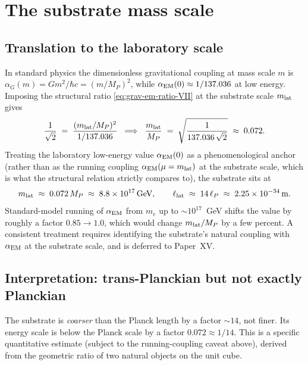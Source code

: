 \documentclass[11pt,a4paper]{article}
\begin{document}
\section{The substrate mass scale}
\label{sec:m-lat}

\subsection{Translation to the laboratory scale}

In standard physics the dimensionless gravitational coupling at
mass scale $m$ is $\alpha_G(m) = G m^2/\hbar c = (m/M_P)^2$,
while $\alpha_{\rm EM}(0) \approx 1/137.036$ at low energy.
Imposing the structural ratio \eqref{eq:grav-em-ratio-VII} at
the substrate scale $m_{\rm lat}$ gives
\begin{equation}
\frac{1}{\sqrt{2}} \;=\; \frac{(m_{\rm lat}/M_P)^2}{1/137.036}
\;\;\Longrightarrow\;\;
\frac{m_{\rm lat}}{M_P} \;=\; \sqrt{\frac{1}{137.036\,\sqrt{2}}}
\;\approx\; 0.072.
\label{eq:m-lat}
\end{equation}
Treating the laboratory low-energy value $\alpha_{\rm EM}(0)$ as
a phenomenological anchor (rather than as the running coupling
$\alpha_{\rm EM}(\mu = m_{\rm lat})$ at the substrate scale, which
is what the structural relation strictly compares to), the
substrate sits at
\begin{equation}
m_{\rm lat} \;\approx\; 0.072\,M_P \;\approx\;
8.8 \times 10^{17}\,\text{GeV},
\qquad
\ell_{\rm lat} \;\approx\; 14\,\ell_P
\;\approx\; 2.25 \times 10^{-34}\,\text{m}.
\end{equation}
Standard-model running of $\alpha_{\rm EM}$ from $m_e$ up to
$\sim 10^{17}$~GeV shifts the value by roughly a factor $0.85
\to 1.0$, which would change $m_{\rm lat}/M_P$ by a few
percent. A consistent treatment requires identifying the
substrate's natural coupling with $\alpha_{\rm EM}$ at the
substrate scale, and is deferred to Paper~XV.

\subsection{Interpretation: trans-Planckian but not exactly Planckian}

The substrate is \emph{coarser} than the Planck length by a
factor $\sim 14$, not finer. Its energy scale is below the
Planck scale by a factor $0.072 \approx 1/14$. This is a
specific quantitative estimate (subject to the running-coupling
caveat above), derived from the geometric ratio of two natural
objects on the unit cube.
\end{document}
